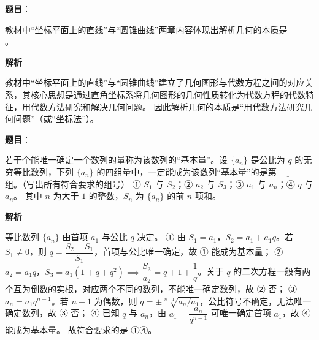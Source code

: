 \begin{answer}

\textbf{题目}：

教材中“坐标平面上的直线”与“圆锥曲线”两章内容体现出解析几何的本质是 $\underline{\qquad}$。

\textbf{解析}

教材中“坐标平面上的直线”与“圆锥曲线”建立了几何图形与代数方程之间的对应关系，其核心思想是通过直角坐标系将几何图形的几何性质转化为代数方程的代数特征，用代数方法研究和解决几何问题。
因此解析几何的本质是“用代数方法研究几何问题”（或“坐标法”）。


\end{answer}
\begin{answer}

\textbf{题目}：

若干个能唯一确定一个数列的量称为该数列的“基本量”。设 $\{a_n\}$ 是公比为 $q$ 的无穷等比数列，下列 $\{a_n\}$ 的四组量中，一定能成为该数列“基本量”的是第 $\underline{\qquad}$ 组。（写出所有符合要求的组号）
① $S_1$ 与 $S_2$；② $a_2$ 与 $S_3$；③ $a_1$ 与 $a_n$；④ $q$ 与 $a_n$。
其中 $n$ 为大于 $1$ 的整数，$S_n$ 为 $\{a_n\}$ 的前 $n$ 项和。

\textbf{解析}

等比数列 $\{a_n\}$ 由首项 $a_1$ 与公比 $q$ 决定。
① 由 $S_1 = a_1$，$S_2 = a_1 + a_1 q$。若 $S_1 \ne 0$，则 $q = \dfrac{S_2 - S_1}{S_1}$，首项与公比唯一确定，故 ① 能成为基本量；
② $a_2 = a_1 q$，$S_3 = a_1(1 + q + q^2) \implies \dfrac{S_3}{a_2} = q + 1 + \dfrac{1}{q}$。关于 $q$ 的二次方程一般有两个互为倒数的实根，对应两个不同的数列，不能唯一确定数列，故 ② 否；
③ $a_n = a_1 q^{n-1}$。若 $n - 1$ 为偶数，则 $q = \pm \sqrt[n-1]{a_n / a_1}$，公比符号不确定，无法唯一确定数列，故 ③ 否；
④ 已知 $q$ 与 $a_n$，由 $a_1 = \dfrac{a_n}{q^{n-1}}$ 可唯一确定首项 $a_1$，故 ④ 能成为基本量。
故符合要求的是 ①④。


\end{answer}
